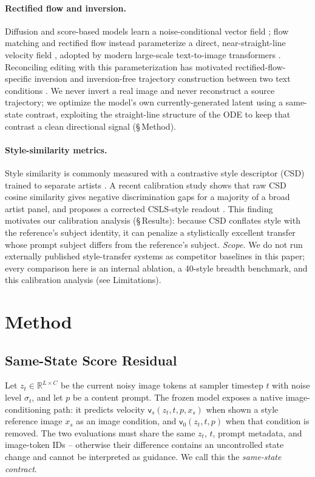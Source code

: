 \documentclass[letterpaper]{article} %
\newcommand{\vel}{\mathsf{v}}
\newcommand{\R}{\mathbb{R}}
\begin{document}
\paragraph{Rectified flow and inversion.}
Diffusion and score-based models learn a noise-conditional vector field
\cite{ho2020ddpm,song2021sde}; flow matching and rectified flow instead
parameterize a direct, near-straight-line velocity field
\cite{lipman2023flow,liu2023rectified}, adopted by modern large-scale
text-to-image transformers \cite{esser2024sd3}. Reconciling editing with this
parameterization has motivated rectified-flow-specific inversion
\cite{rout2025rfinversion} and inversion-free trajectory construction between
two text conditions \cite{kulikov2025flowedit}. We never invert a real image
and never reconstruct a source trajectory; we optimize the model's own
currently-generated latent using a same-state contrast, exploiting the
straight-line structure of the ODE to keep that contrast a clean directional
signal (\S\,Method).

\paragraph{Style-similarity metrics.}
Style similarity is commonly measured with a contrastive style descriptor
(CSD) trained to separate artists \cite{somepalli2024csd}. A recent
calibration study shows that raw CSD cosine similarity gives negative
discrimination gaps for a majority of a broad artist panel, and proposes a
corrected CSLS-style readout \cite{frochte2026csd}. This finding motivates our
calibration analysis (\S\,Results): because CSD conflates style with the
reference's subject identity, it can penalize a stylistically excellent
transfer whose prompt subject differs from the reference's subject.
\emph{Scope.} We do not run externally published style-transfer systems as
competitor baselines in this paper; every comparison here is an internal
ablation, a 40-style breadth benchmark, and this calibration analysis (see
Limitations).

\section{Method}

\subsection{Same-State Score Residual}

Let $z_t\in\R^{L\times C}$ be the current noisy image tokens at sampler
timestep $t$ with noise level $\sigma_t$, and let $p$ be a content prompt. The
frozen model exposes a native image-conditioning path: it predicts velocity
$\vel_s(z_t,t,p,x_s)$ when shown a style reference image $x_s$ as an image
condition, and $\vel_0(z_t,t,p)$ when that condition is removed. The two
evaluations must share the same $z_t$, $t$, prompt metadata, and image-token
IDs -- otherwise their difference contains an uncontrolled state change and
cannot be interpreted as guidance. We call this the \emph{same-state contract}.
\end{document}
